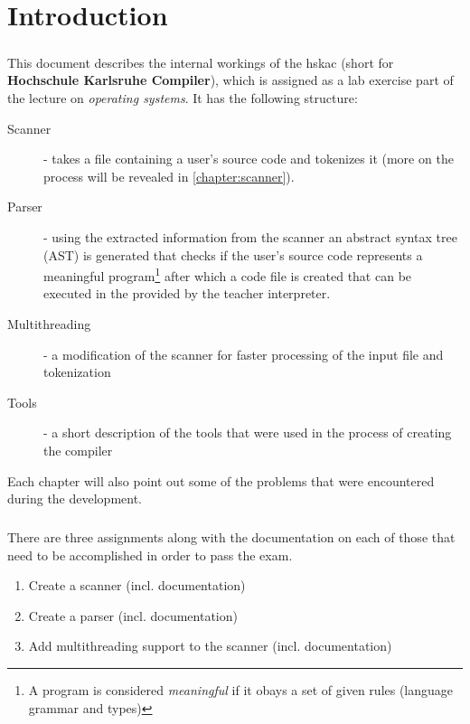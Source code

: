 \chapter{Introduction}
\paragraph{}
	This document describes the internal workings of the hskac (short for \textbf{Hochschule Karlsruhe Compiler}), which is assigned as a lab exercise part of the lecture on \textit{operating systems}. It has the following structure:
\begin{description}
\item[Scanner] - takes a file containing a user's source code and tokenizes it (more on the process will be revealed in \ref{chapter:scanner}).
\item[Parser] - using the extracted information from the scanner an abstract syntax tree (AST) is generated that checks if the user's source code represents a meaningful program\footnote{A program is considered \textit{meaningful} if it obays a set of given rules (language grammar and types)} after which a code file is created that can be executed in the provided by the teacher interpreter.
\item[Multithreading] - a modification of the scanner for faster processing of the input file and tokenization
\item[Tools] - a short description of the tools that were used in the process of creating the compiler
\end{description}
Each chapter will also point out some of the problems that were encountered during the development.
\paragraph{}
	There are three assignments along with the documentation on each of those that need to be accomplished in order to pass the exam.
\begin{enumerate}
\item Create a scanner (incl. documentation)
\item Create a parser (incl. documentation)
\item Add multithreading support to the scanner (incl. documentation)
\end{enumerate}